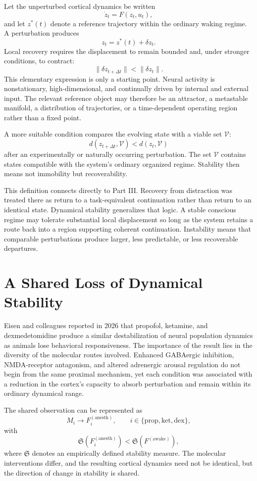 \documentclass[11pt]{book}
\begin{document}
Let the unperturbed cortical dynamics be written
\[
\dot z_t=F(z_t,u_t),
\]
and let $z^{*}(t)$ denote a reference trajectory within the ordinary waking regime. A perturbation produces
\[
z_t=z^{*}(t)+\delta z_t.
\]
Local recovery requires the displacement to remain bounded and, under stronger conditions, to contract:
\[
\|\delta z_{t+\Delta t}\|
<
\|\delta z_t\|.
\]
This elementary expression is only a starting point. Neural activity is nonstationary, high-dimensional, and continually driven by internal and external input. The relevant reference object may therefore be an attractor, a metastable manifold, a distribution of trajectories, or a time-dependent operating region rather than a fixed point.

A more suitable condition compares the evolving state with a viable set $\mathcal V$:
\[
d(z_{t+\Delta t},\mathcal V)
<
d(z_t,\mathcal V)
\]
after an experimentally or naturally occurring perturbation. The set $\mathcal V$ contains states compatible with the system's ordinary organized regime. Stability then means not immobility but recoverability.

This definition connects directly to Part III. Recovery from distraction was treated there as return to a task-equivalent continuation rather than return to an identical state. Dynamical stability generalizes that logic. A stable conscious regime may tolerate substantial local displacement so long as the system retains a route back into a region supporting coherent continuation. Instability means that comparable perturbations produce larger, less predictable, or less recoverable departures.

\section*{A Shared Loss of Dynamical Stability}

Eisen and colleagues reported in 2026 \cite{eisen2026} that propofol, ketamine, and dexmedetomidine produce a similar destabilization of neural population dynamics as animals lose behavioral responsiveness. The importance of the result lies in the diversity of the molecular routes involved. Enhanced GABAergic inhibition, NMDA-receptor antagonism, and altered adrenergic arousal regulation do not begin from the same proximal mechanism, yet each condition was associated with a reduction in the cortex's capacity to absorb perturbation and remain within its ordinary dynamical range.

The shared observation can be represented as
\[
M_i
\longrightarrow
F_i^{(\mathrm{anesth})},
\qquad
i\in\{
\mathrm{prop},
\mathrm{ket},
\mathrm{dex}
\},
\]
with
\[
\mathfrak S
\!\left(
F_i^{(\mathrm{anesth})}
\right)
<
\mathfrak S
\!\left(
F^{(\mathrm{awake})}
\right),
\]
where $\mathfrak S$ denotes an empirically defined stability measure. The molecular interventions differ, and the resulting cortical dynamics need not be identical, but the direction of change in stability is shared.
\end{document}
